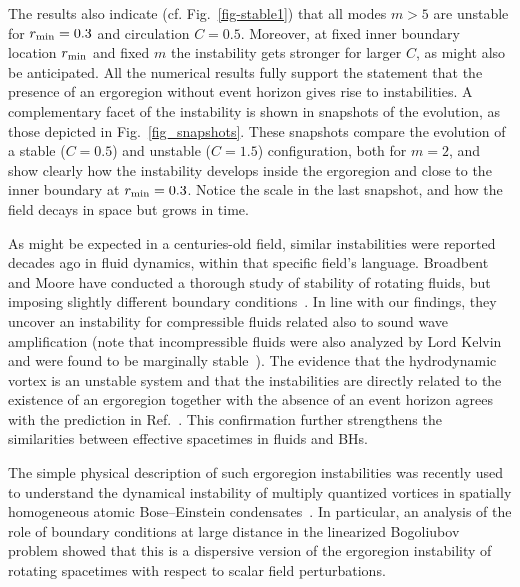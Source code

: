 \documentclass[11pt]{article}
\numberwithin{equation}{section} %
\begin{document}
The results also indicate (cf. Fig.~\ref{fig-stable1}) that all modes $m>5$ are unstable for $r_{\rm min}=0.3$ and circulation $C=0.5$. Moreover, at fixed inner boundary location $r_{\rm min}$ and fixed $m$ the instability gets stronger for larger $C$, as might also be anticipated. All the numerical results fully support the statement that the presence of an ergoregion without event horizon gives rise to instabilities.  
A complementary facet of the instability is shown in snapshots of the evolution, as those depicted in Fig.~\ref{fig_snapshots}. These snapshots compare the evolution of a stable ($C=0.5$) and unstable ($C=1.5$) configuration, both for $m=2$, and show clearly how the instability develops inside the ergoregion and close to the inner boundary at $r_{\rm min}=0.3$. Notice the scale in the last snapshot, and how the field decays in space but grows in time.



As might be expected in a centuries-old field, similar instabilities were reported decades ago in fluid dynamics, within that specific field's language.
Broadbent and Moore have conducted a thorough study of stability of rotating fluids, but imposing slightly different boundary conditions~\cite{Broadbent:1979}. In line with our findings, they uncover an instability for compressible fluids related also to sound wave amplification (note that incompressible fluids were also analyzed by Lord Kelvin and were found to be marginally stable~\cite{Kelvin}).
The evidence that the hydrodynamic vortex is an unstable system and that the instabilities are directly related to the existence of an ergoregion
together with the absence of an event horizon agrees with the prediction in Ref.~\cite{1978CMaPh..63..243F}. This confirmation further strengthens the similarities between effective spacetimes in fluids and BHs.




The simple physical description of such ergoregion instabilities was recently used to understand the dynamical instability of multiply quantized vortices in spatially homogeneous atomic Bose--Einstein condensates~\cite{Giacomelli:2019tvr}. In particular, an analysis of the role of boundary conditions at large distance in the linearized Bogoliubov problem showed that this is a dispersive version of the ergoregion instability of rotating spacetimes with respect to scalar field perturbations. 
\end{document}

